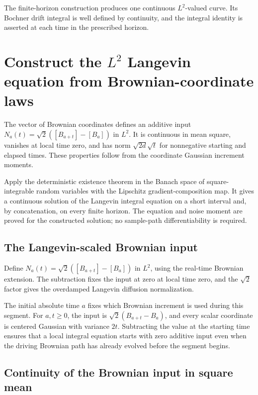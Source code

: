 \documentclass[11pt,a4paper]{article}
\begin{document}
The finite-horizon construction produces one continuous \(L^2\)-valued curve. Its Bochner drift integral is well defined by continuity, and the integral identity is asserted at each time in the prescribed horizon.


\section{\texorpdfstring{Construct the \(L^2\) Langevin equation from Brownian-coordinate laws}{Construct the L² Langevin equation from Brownian-coordinate laws}}


The vector of Brownian coordinates defines an additive input \(N_a(t)=\sqrt2([B_{a+t}]-[B_a])\) in \(L^2\). It is continuous in mean square, vanishes at local time zero, and has norm \(\sqrt{2d}\sqrt t\) for nonnegative starting and elapsed times. These properties follow from the coordinate Gaussian increment moments.



Apply the deterministic existence theorem in the Banach space of square-integrable random variables with the Lipschitz gradient-composition map. It gives a continuous solution of the Langevin integral equation on a short interval and, by concatenation, on every finite horizon. The equation and noise moment are proved for the constructed solution; no sample-path differentiability is required.


\subsection{\texorpdfstring{The Langevin-scaled Brownian input}{The Langevin-scaled Brownian input}}


Define \(N_a(t)=\sqrt2([B_{a+t}]-[B_a])\) in \(L^2\), using the real-time Brownian extension. The subtraction fixes the input at zero at local time zero, and the \(\sqrt2\) factor gives the overdamped Langevin diffusion normalization.



The initial absolute time \(a\) fixes which Brownian increment is used during this segment. For \(a,t\ge0\), the input is \(\sqrt2(B_{a+t}-B_a)\), and every scalar coordinate is centered Gaussian with variance \(2t\). Subtracting the value at the starting time ensures that a local integral equation starts with zero additive input even when the driving Brownian path has already evolved before the segment begins.


\subsection{\texorpdfstring{Continuity of the Brownian input in square mean}{Continuity of the Brownian input in square mean}}
\end{document}
